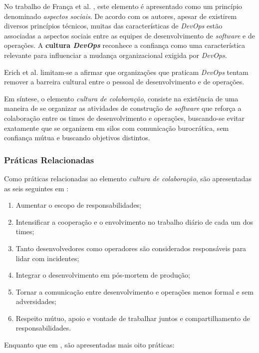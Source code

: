 No trabalho de França et al. \cite{characterizing_devops}, este elemento é
apresentado como um princípio denominado \emph{aspectos sociais}. De acordo com os
autores, apesar de existirem diversos princípios técnicos, muitas das
características de \textit{DevOps} estão associadas a aspectos sociais entre as
equipes de desenvolvimento de \textit{software} e de operações. A \textbf{cultura
\textit{DevOps}} reconhece a confiança como uma característica relevante para
influenciar a mudança organizacional exigida por \textit{DevOps}.

Erich et al. \cite{qualitative_devops_journalsw_17} limitam-se a afirmar que
organizações que praticam \textit{DevOps} tentam remover a barreira cultural
entre o pessoal de desenvolvimento e de operações.

Em síntese, o elemento \emph{cultura de colaboração}, consiste na existência de
 uma maneira de se organizar as atividades de construção
de \textit{software} que reforça a colaboração entre os times de desenvolvimento
e operações, buscando-se evitar exatamente que se organizem em silos com
comunicação burocrática, sem confiança mútua e buscando objetivos distintos.

\subsubsection{Práticas Relacionadas}

Como práticas relacionadas ao elemento \emph{cultura de colaboração}, são
apresentadas as seis seguintes em \cite{extending_dimensions}:

\begin{enumerate}
\item Aumentar o escopo de responsabilidades;
\item Intensificar a cooperação e o envolvimento no trabalho diário de cada um
dos times;
\item Tanto desenvolvedores como operadores são considerados responsáveis para
lidar com incidentes;
\item Integrar o desenvolvimento em pós-mortem de produção;
\item Tornar a comunicação entre desenvolvimento e operações menos formal e
sem adversidades;
\item Respeito mútuo, apoio e vontade de trabalhar juntos e compartilhamento
de responsabilidades.
\end{enumerate}

Enquanto que em \cite{characterizing_devops}, são apresentadas mais oito
práticas:

